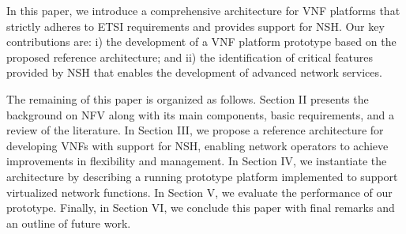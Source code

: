 

In this paper, we introduce a comprehensive architecture for VNF platforms that strictly adheres to ETSI requirements and provides support for NSH. Our key contributions are: i) the development of a VNF platform prototype based on the proposed reference architecture; and ii) the identification of critical features provided by NSH that enables the development of advanced network services.

The remaining of this paper is organized as follows. Section II presents the background on NFV along with its main components, basic requirements, and a review of the literature. In Section III, we propose a reference architecture for developing VNFs with support for NSH, enabling network operators to achieve improvements in flexibility and management. In Section IV, we instantiate the architecture by describing a running prototype platform implemented to support virtualized network functions. In Section V, we evaluate the performance of our prototype. Finally, in Section VI, we conclude this paper with final remarks and an outline of future work.
